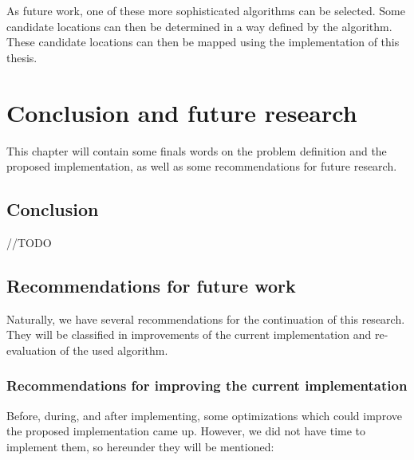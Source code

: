 As future work, one of these more sophisticated algorithms can be selected. Some candidate locations can then be determined in a way defined by the algorithm. These candidate locations can then be mapped using the implementation of this thesis.%

\chapter{Conclusion and future research}
\label{ch:Conclusions}

This chapter will contain some finals words on the problem definition and the proposed implementation, as well as some recommendations for future research.

\section{Conclusion}

//TODO

\section{Recommendations for future work}

Naturally, we have several recommendations for the continuation of this research. They will be classified in improvements of the current implementation and re-evaluation of the used algorithm.

\subsection{Recommendations for improving the current implementation}

Before, during, and after implementing, some optimizations which could improve the proposed implementation came up. However, we did not have time to implement them, so hereunder they will be mentioned:

